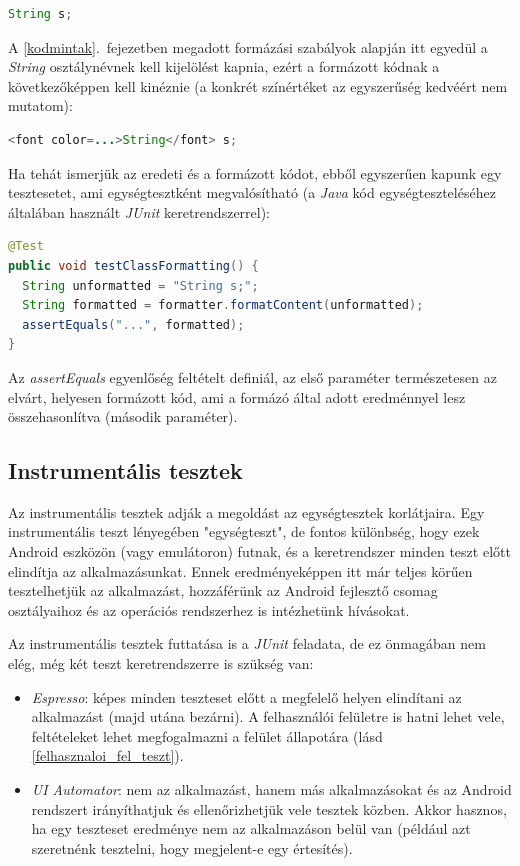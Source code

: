 \documentclass[12pt,a4paper]{article}
\begin{document}
	\begin{lstlisting}[language=Java]
String s;
	\end{lstlisting}
	
	A \ref{kodmintak}.\ fejezetben megadott formázási szabályok alapján itt egyedül a \textit{String} osztálynévnek kell kijelölést kapnia, ezért a formázott kódnak a következőképpen kell kinéznie (a konkrét színértéket az egyszerűség kedvéért nem mutatom):
	
	\begin{lstlisting}[language=Java]
<font color=...>String</font> s;
	\end{lstlisting}
	
	Ha tehát ismerjük az eredeti és a formázott kódot, ebből egyszerűen kapunk egy tesztesetet, ami egységtesztként megvalósítható (a \textit{Java} kód egységteszteléséhez általában használt \textit{JUnit} keretrendszerrel):
	
	\begin{lstlisting}[language=Java]
@Test
public void testClassFormatting() {
  String unformatted = "String s;";
  String formatted = formatter.formatContent(unformatted);
  assertEquals("...", formatted);
}
	\end{lstlisting}
	
	Az \textit{assertEquals} egyenlőség feltételt definiál, az első paraméter természetesen az elvárt, helyesen formázott kód, ami a formázó által adott eredménnyel lesz összehasonlítva (második paraméter).
	
	\subsection{Instrumentális tesztek}\label{instrumental_tests}

	Az instrumentális tesztek adják a megoldást az egységtesztek korlátjaira. Egy instrumentális teszt lényegében "egységteszt", de fontos különbség, hogy ezek Android eszközön (vagy emulátoron) futnak, és a keretrendszer minden teszt előtt elindítja az alkalmazásunkat. Ennek eredményeképpen itt már teljes körűen tesztelhetjük az alkalmazást, hozzáférünk az Android fejlesztő csomag osztályaihoz és az operációs rendszerhez is intézhetünk hívásokat.
	
	Az instrumentális tesztek futtatása is a \textit{JUnit} feladata, de ez önmagában nem elég, még két teszt keretrendszerre is szükség van:
	
	\begin{itemize}
		\item \textit{Espresso}: képes minden teszteset előtt a megfelelő helyen elindítani az alkalmazást (majd utána bezárni). A felhasználói felületre is hatni lehet vele, feltételeket lehet megfogalmazni a felület állapotára (lásd \ref{felhasznaloi_fel_teszt}).
		\item \textit{UI Automator}: nem az alkalmazást, hanem más alkalmazásokat és az Android rendszert irányíthatjuk és ellenőrizhetjük vele tesztek közben. Akkor hasznos, ha egy teszteset eredménye nem az alkalmazáson belül van (például azt szeretnénk tesztelni, hogy megjelent-e egy értesítés).
	\end{itemize}
	
\end{document}

